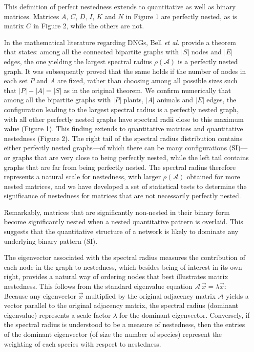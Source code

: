 \documentclass[pdftex]{nature}
\begin{document}
This definition of perfect nestedness extends to quantitative as well
as binary matrices.  Matrices $A$, $C$, $D$, $I$, $K$ and $N$ in
Figure 1 are perfectly nested, as is matrix $C$ in Figure 2, while the
others are not.

In the mathematical literature regarding DNGs, Bell \emph{et
  al.}\cite{bell2008graphs} provide a theorem that states: among all
the connected bipartite graphs with $|S|$ nodes and $|E|$ edges, the
one yielding the largest spectral radius $\rho(\mathcal A)$ is a
perfectly nested graph. It was subsequently proved that the same holds
if the number of nodes in each set $P$ and $A$ are
fixed\cite{ProvePAE}, rather than choosing among all possible sizes
such that $|P|+|A|=|S|$ as in the original theorem. We confirm
numerically that among all the bipartite graphs with $|P|$ plants,
$|A|$ animals and $|E|$ edges, the configuration leading to the
largest spectral radius is a perfectly nested graph, with all other
perfectly nested graphs have spectral radii close to this maximum
value (Figure 1).  This finding extends to quantitative matrices and
quantitative nestedness (Figure 2).  The right tail of the spectral
radius distribution contains either perfectly nested graphs---of which
there can be many configurations (SI)---or graphs that are very close
to being perfectly nested, while the left tail contains graphs that
are far from being perfectly nested.  The spectral radius therefore
represents a natural scale for nestedness, with larger $\rho(\mathcal
A)$ obtained for more nested matrices, and we have developed a set of
statistical tests to determine the significance of nestedness for
matrices that are not necessarily perfectly nested.

Remarkably, matrices that are significantly non-nested in their binary
form become significantly nested when a nested quantitative pattern is
overlaid.  This suggests that the quantitative structure of a network
is likely to dominate any underlying binary pattern (SI).

The eigenvector associated with the spectral radius measures the
contribution of each node in the graph to nestedness, which besides
being of interest in its own right\cite{GoogleFW}, provides a natural
way of ordering nodes that best illustrates matrix nestedness.  This
follows from the standard eigenvalue equation $\mathcal A \, \vec{x} =
\lambda \vec{x}$: Because any eigenvector $\vec{x}$ multiplied by the
original adjacency matrix $\mathcal A$ yields a vector parallel to the
original adjacency matrix, the spectral radius (dominant eigenvalue)
represents a scale factor $\lambda$ for the dominant eigenvector.
Conversely, if the spectral radius is understood to be a measure of
nestedness, then the entries of the dominant eigenvector (of size the
number of species) represent the weighting of each species with
respect to nestedness.
\end{document}
